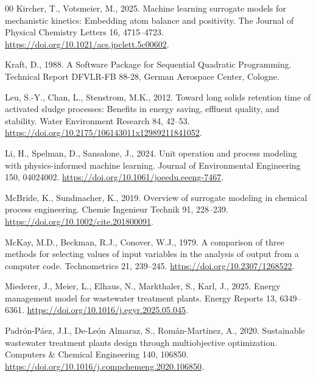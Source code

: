\documentclass[a4paper,fleqn]{cas-sc}
\begin{document}
\begin{thebibliography}{00}
Kircher, T., Votsmeier, M., 2025. Machine learning surrogate models for mechanistic kinetics: Embedding atom balance and positivity. The Journal of Physical Chemistry Letters 16, 4715--4723. \url{https://doi.org/10.1021/acs.jpclett.5c00602}.

Kraft, D., 1988. A Software Package for Sequential Quadratic Programming. Technical Report DFVLR-FB 88-28, German Aerospace Center, Cologne.

Leu, S.-Y., Chan, L., Stenstrom, M.K., 2012. Toward long solids retention time of activated sludge processes: Benefits in energy saving, effluent quality, and stability. Water Environment Research 84, 42--53. \url{https://doi.org/10.2175/106143011x12989211841052}.

Li, H., Spelman, D., Sansalone, J., 2024. Unit operation and process modeling with physics-informed machine learning. Journal of Environmental Engineering 150, 04024002. \url{https://doi.org/10.1061/joeedu.eeeng-7467}.

McBride, K., Sundmacher, K., 2019. Overview of surrogate modeling in chemical process engineering. Chemie Ingenieur Technik 91, 228--239. \url{https://doi.org/10.1002/cite.201800091}.

McKay, M.D., Beckman, R.J., Conover, W.J., 1979. A comparison of three methods for selecting values of input variables in the analysis of output from a computer code. Technometrics 21, 239--245. \url{https://doi.org/10.2307/1268522}.

Miederer, J., Meier, L., Elhaus, N., Markthaler, S., Karl, J., 2025. Energy management model for wastewater treatment plants. Energy Reports 13, 6349--6361. \url{https://doi.org/10.1016/j.egyr.2025.05.045}.

Padr\'on-P\'aez, J.I., De-Le\'on Almaraz, S., Rom\'an-Mart\'inez, A., 2020. Sustainable wastewater treatment plants design through multiobjective optimization. Computers \& Chemical Engineering 140, 106850. \url{https://doi.org/10.1016/j.compchemeng.2020.106850}.


\end{thebibliography}
\end{document}
